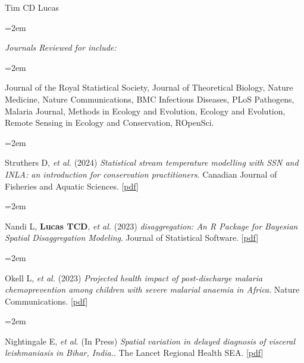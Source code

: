 \documentclass{scrartcl}
\newcommand{\MarginText}[1]{\marginpar{\raggedleft\itshape\small#1}} %
\newcommand{\Description}[1]{\hangindent=2em\hangafter=0\noindent\raggedright\footnotesize{#1}\par\normalsize\vspace{1em}} %
\begin{document}
\begin{cv}{Tim {\Large CD} Lucas}

\vspace{1em} %
{\color{Maroon}}\vspace{1em}

\Description{\MarginText{Peer Review}\emph{Journals Reviewed for include:}}

\vspace{-0.5em} %


\Description{Journal of the Royal Statistical Society, Journal of Theoretical Biology, Nature Medicine, Nature Communications, BMC Infectious Diseases, PLoS Pathogens, Malaria Journal, Methods in Ecology and Evolution, Ecology and Evolution, Remote Sensing in Ecology and Conservation, ROpenSci.}




\vspace{1em} %

{\color{Maroon}}\vspace{1em}


\Description{\MarginText{2024}Struthers D, \emph{et al.} (2024) \emph{Statistical stream temperature modelling with SSN and INLA: an introduction for conservation practitioners}. Canadian Journal of Fisheries and Aquatic Sciences. [\href{https://cdnsciencepub.com/doi/full/10.1139/cjfas-2023-0136}{pdf}]}


\Description{\MarginText{2023}Nandi L, \textbf{Lucas TCD}, \emph{et al.} (2023) \emph{disaggregation: An R Package for Bayesian Spatial Disaggregation Modeling}. Journal of Statistical Software. [\href{https://www.jstatsoft.org/article/view/v106i11}{pdf}]}

\Description{Okell L, \emph{et al.} (2023) \emph{Projected health impact of post-discharge malaria chemoprevention among children with severe malarial anaemia in Africa}. Nature Communications. [\href{https://www.nature.com/articles/s41467-023-35939-w}{pdf}]}


\Description{Nightingale E, \emph{et al.} (In Press) \emph{Spatial variation in delayed diagnosis of visceral leishmaniasis in Bihar, India.}. The Lancet Regional Health SEA. [\href{https://papers.ssrn.com/sol3/papers.cfm?abstract_id=4233127}{pdf}]}




\end{cv}
\end{document}
